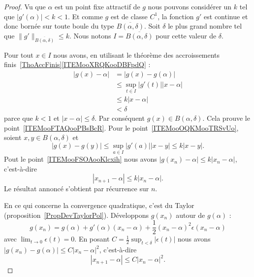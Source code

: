 \begin{proof}
    Vu que \( \alpha\) est un point fixe attractif de \( g\) nous pouvons considérer un \( k\) tel que \( | g'(\alpha) |<k<1\). Et comme \( g\) est de classe \( C^1\), la fonction \( g'\) est continue et donc bornée sur toute boule du type \( \overline{ B(\alpha,\delta) }\). Soit \( \delta\) le plus grand nombre tel que \( \| g' \|_{\overline{ B(\alpha,\delta) }}\leq k\). Nous notons \( I=\overline{ B(\alpha,\delta) } \) pour cette valeur de \( \delta\).

    Pour tout \( x\in I\) nous avons, en utilisant le théorème des accroissements finis~\ref{ThoAccFinis}\ref{ITEMooXRQKooDBFpdQ} :
    \begin{subequations}        \label{SUBEQooYXLHooSCnnRA}
        \begin{align}
            | g(x)-\alpha |&=| g(x)-g(\alpha) |\\
            &\leq\sup_{t\in I}| g'(t) | |x-\alpha |\\
            &\leq k| x-\alpha |\\
            &<\delta
        \end{align}
    \end{subequations}
    parce que \( k<1\) et \(| x-\alpha |\leq \delta\). Par conséquent \( g(x)\in B(\alpha,\delta)\). Cela prouve le point~\ref{ITEMooFTAQooPBsBcR}. Pour le point~\ref{ITEMooOQKMooTRSvUo}, soient \( x,y\in B(\alpha,\delta)\) et
    \begin{equation}
        | g(x)-g(y) |\leq \sup_{a\in I}| g'(a) | |x-y |\leq k| x-y |.
    \end{equation}
    Pout le point~\ref{ITEMooFSOAooKlcxih} nous avons \( | g(x_n)-\alpha |\leq k| x_n-\alpha |\), c'est-à-dire
    \begin{equation}
        | x_{n+1}-\alpha |\leq k| x_n-\alpha |.
    \end{equation}
    Le résultat annoncé s'obtient par récurrence sur \( n\).

    En ce qui concerne la convergence quadratique, c'est du Taylor (proposition~\ref{PropDevTaylorPol}). Développons \( g(x_n)\) autour de \( g(\alpha)\) :
    \begin{equation}
        g(x_n)=g(\alpha)+g'(\alpha)(x_n-\alpha)+\frac{ 1 }{2}(x_n-\alpha)^2\epsilon(x_n-\alpha)
    \end{equation}
    avec \( \lim_{t\to 0} \epsilon(t)=0\). En posant \( C=\frac{ 1 }{2}\sup_{t<\delta}| \epsilon(t) | \) nous avons $| g(x_n)-g(\alpha) |\leq C|x_n-\alpha  |^2$, c'est-à-dire
    \begin{equation}
        | x_{n+1}-\alpha |\leq C| x_n-\alpha |^2.
    \end{equation}
\end{proof}

